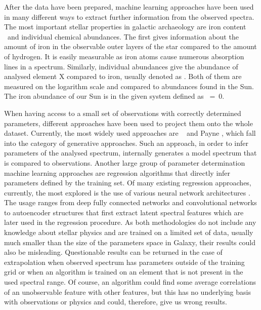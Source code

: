 After the data have been prepared, machine learning approaches have been used in many different ways to extract further information from the observed spectra. The most important stellar properties in galactic archaeology are iron content \Feh\ and individual chemical abundances. The first gives information about the amount of iron in the observable outer layers of the star compared to the amount of hydrogen. It is easily measurable as iron atoms cause numerous absorption lines in a spectrum. Similarly, individual abundances give the abundance of analysed element X compared to iron, usually denoted as \Xfe. Both of them are measured on the logarithm scale and compared to abundances found in the Sun. The iron abundance of our Sun is in the given system defined as \Feh~=~0.

When having access to a small set of observations with correctly determined parameters, different approaches have been used to project them onto the whole dataset. Currently, the most widely used approaches are \TC\ \cite{2015ApJ...808...16N, buder2018} and Payne \cite{2019ApJ...879...69T}, which fall into the category of generative approaches. Such an approach, in order to infer parameters of the analysed spectrum, internally generates a model spectrum that is compared to observations. Another large group of parameter determination machine learning approaches are regression algorithms that directly infer parameters defined by the training set. Of many existing regression approaches, currently, the most explored is the use of various neural network architectures \cite{2015MNRAS.452..158Y, 2019MNRAS.483.3255L, 2020ApJ...891...23W, 2020arXiv200208390O}. The usage ranges from deep fully connected networks and convolutional networks to autoencoder structures that first extract latent spectral features which are later used in the regression procedure. As both methodologies do not include any knowledge about stellar physics and are trained on a limited set of data, usually much smaller than the size of the parameters space in Galaxy, their results could also be misleading. Questionable results can be returned in the case of extrapolation when observed spectrum has parameters outside of the training grid or when an algorithm is trained on an element that is not present in the used spectral range. Of course, an algorithm could find some average correlations of an unobservable feature with other features, but this has no underlying basis with observations or physics and could, therefore, give us wrong results.

